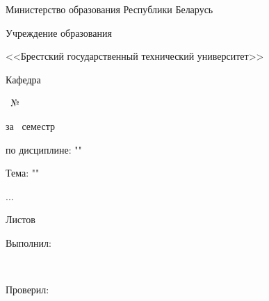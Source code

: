 \begin{center}
    Министерство образования Республики Беларусь

    Учреждение образования

    <<Брестский государственный технический университет>>

    Кафедра \titlePageKafedra
\end{center}

\vfill

\begin{center}
    \titlePageWorkType~№\titlePageWorkNumber

    за \titlePageSemestr~семестр

    по дисциплине: "\titlePageLesson"

    Тема: "\titlePageTopic"
\end{center}

\vfill

\begin{center}
    .\titlePageStudentCreditCard.\titlePageStudentGroupLetter\titlePageStudentGroupNumber.\titlePageCodeMain

    \hspace{0pt}

    Листов \pageref{LastPage}
\end{center}

\vfill

\begin{flushright}
    \begin{minipage}[t]{7cm}
        Выполнил:

        \titlePageStudentType

        \titlePageStudentSurname~\titlePageStudentName

        \hspace{0pt}

        Проверил:

        \titlePageTeacherType

        \titlePageTeacherSurname~\titlePageTeacherName
    \end{minipage}
\end{flushright}

\vfill

\begin{center}
    \titlePageCity~\ESKDtheYear
\end{center}